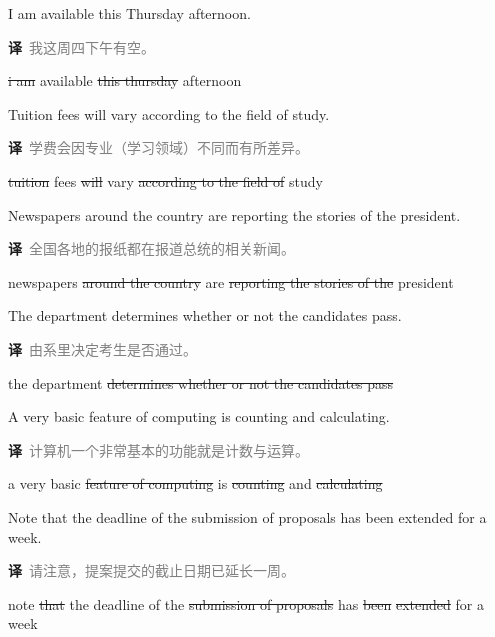\documentclass[11pt]{article}
\newcommand{\sg}[1]{\textcolor{cSpkGood}{#1}}   %
\newcommand{\sy}[1]{\textcolor{cSpkOk}{#1}}     %
\newcommand{\sr}[1]{\textcolor{cSpkBad}{#1}}    %
\newcommand{\smiss}[1]{\textcolor{cSpkBad}{\sout{#1}}}  %
\newcommand{\zh}[1]{{\footnotesize\textcolor{cNote}{\textbf{译}}\ \textcolor{gray}{#1}}}
\begin{document}
{\small I am available this Thursday afternoon.}\par \zh{我这周四下午有空。}\par\smallskip
\begin{asrbox}\smiss{i am} \sg{available} \smiss{this thursday} \sg{afternoon}\end{asrbox}

{\small Tuition fees will vary according to the field of study.}\par \zh{学费会因专业（学习领域）不同而有所差异。}\par\smallskip
\begin{asrbox}\smiss{tuition} \sg{fees} \smiss{will} \sg{vary} \smiss{according to the field of} \sg{study}\end{asrbox}

{\small Newspapers around the country are reporting the stories of the president.}\par \zh{全国各地的报纸都在报道总统的相关新闻。}\par\smallskip
\begin{asrbox}\sy{newspapers} \smiss{around the country} \sg{are} \smiss{reporting the stories of the} \sg{president}\end{asrbox}

{\small The department determines whether or not the candidates pass.}\par \zh{由系里决定考生是否通过。}\par\smallskip
\begin{asrbox}\sg{the} \sr{department} \smiss{determines whether or not the candidates pass}\end{asrbox}

{\small A very basic feature of computing is counting and calculating.}\par \zh{计算机一个非常基本的功能就是计数与运算。}\par\smallskip
\begin{asrbox}\sr{a} \sg{very basic} \smiss{feature of computing} \sg{is} \smiss{counting} \sg{and} \smiss{calculating}\end{asrbox}

{\small Note that the deadline of the submission of proposals has been extended for a week.}\par \zh{请注意，提案提交的截止日期已延长一周。}\par\smallskip
\begin{asrbox}\sg{note} \smiss{that} \sg{the deadline} \sy{of} \sg{the} \smiss{submission of proposals} \sg{has} \smiss{been} \smiss{extended} \sg{for} \sr{a} \sg{week}\end{asrbox}
\end{document}
